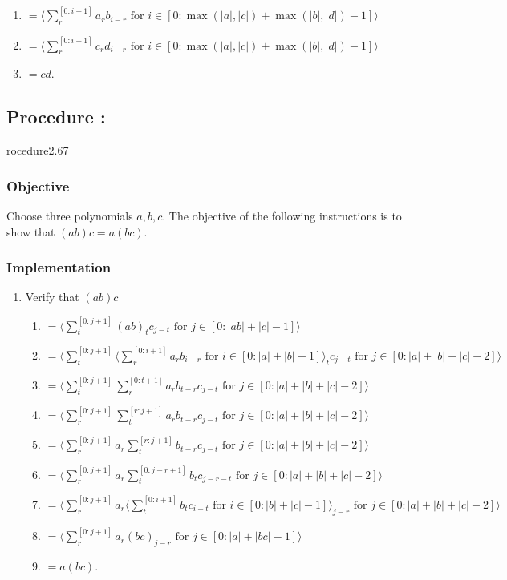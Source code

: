 \documentclass{article}
\newcommand{\for}{\text{ for }}
\newcounter{procedure}[part]
\newcommand{\procedure}[1]{\subsection*{Procedure \thepart:\theprocedure}\label{sec:procedure #1}\global\expandafter\edef\csname procedure#1\endcsname{\thepart:\theprocedure}\addtocounter{procedure}{1}}
\newcommand{\objective}{\subsubsection*{Objective}}
\newcommand{\implementation}{\subsubsection*{Implementation}}
\begin{document}
\begin{multicols}{2}
\begin{enumerate}
					\begin{enumerate}
						\item $=\langle\sum_r^{[0:i+1]}a_rb_{i-r}\for i\in[0:\max(\lvert a\rvert,\lvert c\rvert)+\max(\lvert b\rvert,\lvert d\rvert)-1]\rangle$
						\item $=\langle\sum_r^{[0:i+1]}c_rd_{i-r}\for i\in[0:\max(\lvert a\rvert,\lvert c\rvert)+\max(\lvert b\rvert,\lvert d\rvert)-1]\rangle$
						\item $=cd$.
					\end{enumerate}
				\end{enumerate}
		\procedure{2.67}
			\objective
				Choose three polynomials $a,b,c$. The objective of the following instructions is to show that $(ab)c=a(bc)$.
			\implementation
				\begin{enumerate}
					\item Verify that $(ab)c$
					\begin{enumerate}
						\item $=\langle\sum_t^{[0:j+1]}(ab)_tc_{j-t}\for j\in[0:\lvert ab\rvert+\lvert c\rvert-1]\rangle$
						\item $=\langle\sum_t^{[0:j+1]}\langle\sum_r^{[0:i+1]}a_rb_{i-r}\for i\in[0:\lvert a\rvert+\lvert b\rvert-1]\rangle_tc_{j-t}\for j\in[0:\lvert a\rvert+\lvert b\rvert+\lvert c\rvert-2]\rangle$
						\item $=\langle\sum_t^{[0:j+1]}\sum_r^{[0:t+1]}a_rb_{t-r}c_{j-t}\for j\in[0:\lvert a\rvert+\lvert b\rvert+\lvert c\rvert-2]\rangle$
						\item $=\langle\sum_r^{[0:j+1]}\sum_t^{[r:j+1]}a_rb_{t-r}c_{j-t}\for j\in[0:\lvert a\rvert+\lvert b\rvert+\lvert c\rvert-2]\rangle$
						\item $=\langle\sum_r^{[0:j+1]}a_r\sum_t^{[r:j+1]}b_{t-r}c_{j-t}\for j\in[0:\lvert a\rvert+\lvert b\rvert+\lvert c\rvert-2]\rangle$
						\item $=\langle\sum_r^{[0:j+1]}a_r\sum_t^{[0:j-r+1]}b_{t}c_{j-r-t}\for j\in[0:\lvert a\rvert+\lvert b\rvert+\lvert c\rvert-2]\rangle$
						\item $=\langle\sum_r^{[0:j+1]}a_r\langle\sum_t^{[0:i+1]}b_{t}c_{i-t}\for i\in[0:\lvert b\rvert+\lvert c\rvert-1]\rangle_{j-r}\for j\in[0:\lvert a\rvert+\lvert b\rvert+\lvert c\rvert-2]\rangle$
						\item $=\langle\sum_r^{[0:j+1]}a_r(bc)_{j-r}\for j\in[0:\lvert a\rvert+\lvert bc\rvert-1]\rangle$
						\item $=a(bc)$.
					\end{enumerate}
				\end{enumerate}

\end{multicols}
\end{document}
